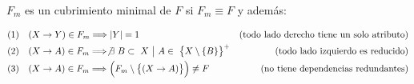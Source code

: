 \documentclass[preview]{standalone}
\begin{document}
$F_m$ es un cubrimiento minimal de $F$ si $F_m\equiv F$ y adem\'as:

\begin{align*}
(1)\quad  & (X\rightarrow Y) \in F_m \Longrightarrow |Y| = 1& \text{(todo lado derecho tiene un solo atributo)}\\
(2)\quad  & (X\rightarrow A) \in F_m \Longrightarrow \not \exists \ B \subset \ X \ \big| \  A\in \  \big\{ X \setminus \{B\} \big\}^+ & \text{(todo lado izquierdo es reducido)}\\
(3)\quad  & (X\rightarrow A) \in F_m \Longrightarrow \Big(F_m\setminus\big\{(X\rightarrow A)\big\}\Big)\not\equiv F & \text{(no tiene dependencias redundantes)}\\
\end{align*}
\end{document}

